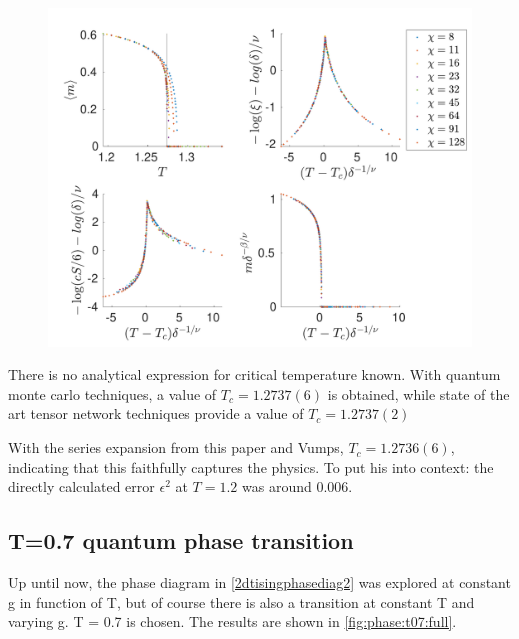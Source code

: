 \begin{figure}
    \center
    \includegraphics[width=\textwidth]{Figuren/phasediag/g25/zoomed.pdf}
    \caption{  }
    \label{fig:phase:g25:zoomed}
\end{figure}

There is no analytical expression for critical temperature known. With quantum monte carlo techniques, a value of $T_c=1.2737(6)$ is obtained, while state of the art tensor network techniques provide a value of $T_c=1.2737(2)$ \cite{Czarnik2019}

With the series expansion from this paper and Vumps, $T_c=1.2736(6)$, indicating that this faithfully captures the physics. To put his into context: the directly calculated error $\epsilon^{2}$  at $T=1.2$ was around $0.006$.

\subsection{T=0.7 quantum phase transition }\label{tphasetranssubsec}

Up until now, the phase diagram in \cref{2dtisingphasediag2} was explored at constant g in function of T, but of course there is also a transition at constant T and varying g.  T = 0.7 is chosen. The results are shown in \cref{fig:phase:t07:full}.

